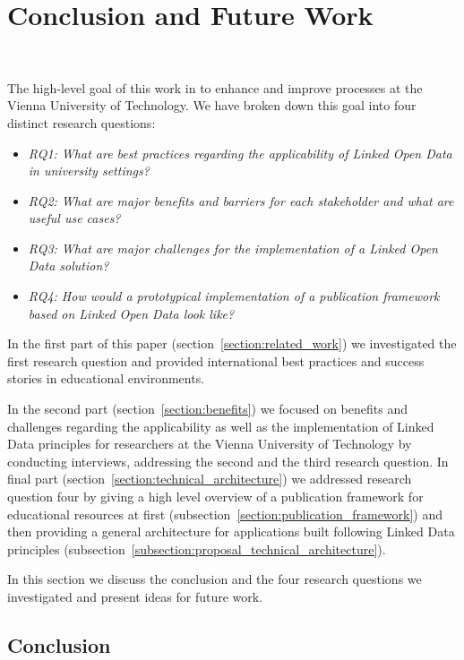 \section{Conclusion and Future Work}~\label{section:conclusion}

The high-level goal of this work in to enhance and improve processes at the Vienna University of Technology. We have broken down this goal into four distinct research questions:

\begin{itemize}
	\item \textit{RQ1: What are best practices regarding the applicability of Linked Open Data in university settings?}
	\item \textit{RQ2: What are major benefits and barriers for each stakeholder and what are useful use cases?}
	\item \textit{RQ3: What are major challenges for the implementation of a Linked Open Data solution?}
	\item \textit{RQ4: How would a prototypical implementation of a publication framework based on Linked Open Data look like?}
\end{itemize}

In the first part of this paper (section~\ref{section:related_work}) we investigated the first research question and provided international best practices and success stories in educational environments. 

In the second part (section~\ref{section:benefits}) we focused on benefits and challenges regarding the applicability as well as the implementation of Linked Data principles for researchers at the Vienna University of Technology by conducting interviews, addressing the second and the third research question. 
In final part (section~\ref{section:technical_architecture}) we addressed research question four by giving a high level overview of a publication framework for educational resources at first (subsection~\ref{section:publication_framework}) and then providing a general architecture for applications built following Linked Data principles (subsection~\ref{subsection:proposal_technical_architecture}).

In this section we discuss the conclusion and the four research questions we investigated and present ideas for future work.

\subsection{Conclusion}~\label{subsection:future_work}

